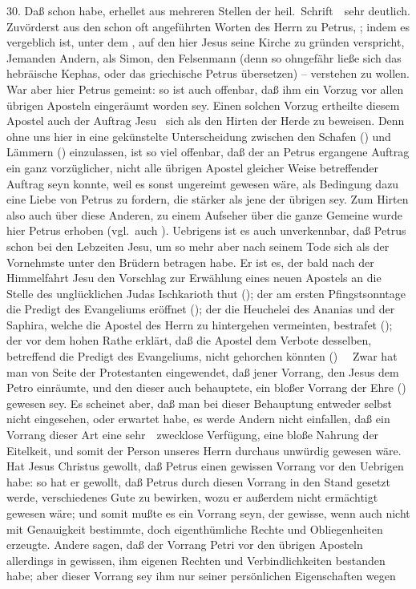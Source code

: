 \begin{aufza}
\item[30.] Daß schon  habe, erhellet aus mehreren Stellen der heil.\ Schrift~\ sehr deutlich. Zuvörderst aus den schon oft angeführten Worten des Herrn zu Petrus, ; indem es vergeblich ist, unter dem , auf den hier Jesus seine Kirche zu gründen verspricht, Jemanden Andern, als Simon, den Felsenmann (denn so ohngefähr ließe sich das hebräische Kephas, oder das griechische Petrus übersetzen) -- verstehen zu wollen. War aber hier Petrus gemeint: so ist auch offenbar, daß ihm ein Vorzug vor allen übrigen Aposteln eingeräumt worden sey. Einen solchen Vorzug ertheilte diesem Apostel auch der Auftrag Jesu \ sich als den Hirten der Herde zu beweisen. Denn ohne uns hier in eine gekünstelte Unterscheidung zwischen den Schafen () und Lämmern () einzulassen, ist so viel offenbar, daß der an Petrus ergangene Auftrag ein ganz vorzüglicher, nicht alle übrigen Apostel gleicher Weise betreffender Auftrag seyn konnte, weil es sonst ungereimt gewesen wäre, als Bedingung dazu eine Liebe von Petrus zu fordern, die stärker als jene der übrigen sey. Zum Hirten also auch über diese Anderen, zu einem Aufseher über die ganze Gemeine wurde hier Petrus erhoben (vgl.\ auch ). Uebrigens ist es auch unverkennbar, daß Petrus schon bei den Lebzeiten Jesu, um so mehr aber nach seinem Tode sich als der Vornehmste unter den Brüdern betragen habe. Er ist es, der bald nach der Himmelfahrt Jesu den Vorschlag zur Erwählung eines neuen Apostels an die Stelle des unglücklichen Judas Ischkarioth thut (); der am ersten Pfingstsonntage die Predigt des Evangeliums eröffnet (); der die Heuchelei des Ananias und der Saphira, welche die Apostel des Herrn zu hintergehen vermeinten, bestrafet (); der vor dem hohen Rathe erklärt, daß die Apostel dem Verbote desselben, betreffend die Predigt des Evangeliums, nicht gehorchen könnten () \usw\ \usw\ Zwar hat man von Seite der Protestanten eingewendet, daß jener Vorrang, den Jesus dem Petro einräumte, und den dieser auch behauptete, ein bloßer Vorrang der Ehre () gewesen sey. Es scheinet aber, daß man bei dieser Behauptung entweder selbst nicht eingesehen, oder erwartet habe, es werde Andern nicht einfallen, daß ein Vorrang dieser Art eine sehr~\ zwecklose Verfügung, eine bloße Nahrung der Eitelkeit, und somit der Person unseres Herrn durchaus unwürdig gewesen wäre. Hat Jesus Christus gewollt, daß Petrus einen gewissen Vorrang vor den Uebrigen habe: so hat er gewollt, daß Petrus durch diesen Vorrang in den Stand gesetzt werde, verschiedenes Gute zu bewirken, wozu er außerdem nicht ermächtigt gewesen wäre; und somit mußte es ein Vorrang seyn, der gewisse, wenn auch nicht mit Genauigkeit bestimmte, doch eigenthümliche Rechte und Obliegenheiten erzeugte. Andere sagen, daß der Vorrang Petri vor den übrigen Aposteln allerdings in gewissen, ihm eigenen Rechten und Verbindlichkeiten bestanden habe; aber dieser Vorrang sey ihm nur seiner persönlichen Eigenschaften wegen 
\end{aufza}
